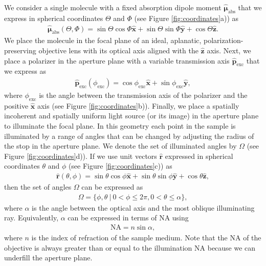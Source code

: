 \documentclass[10pt]{article}
\providecommand{\mb}[1]{\mathbf{#1}}
\providecommand{\mh}[1]{\mathbf{\hat{#1}}}
\providecommand{\bs}[1]{\boldsymbol{#1}}
\begin{document}
We consider a single molecule with a fixed absorption dipole moment
$\hat{\bs{\mu}}_{\text{abs}}$ that we express in spherical coordinates $\Theta$
and $\Phi$ (see Figure \ref{fig:coordinates}a)) as
\begin{align}
  \hat{\bs{\mu}}_{\text{abs}}(\Theta, \Phi) = \sin\Theta\cos\Phi\hat{\mb{x}} + \sin\Theta\sin\Phi\hat{\mb{y}} + \cos\Theta\hat{\mb{z}} \label{eq:mu}.
\end{align}
We place the molecule in the focal plane of an ideal, aplanatic,
polarization-preserving objective lens with its optical axis aligned with the
$\mh{z}$ axis. Next, we place a polarizer in the aperture plane with a variable
transmission axis $\hat{\mb{p}}_{\text{exc}}$ that we express as
\begin{align}
 \hat{\mb{p}}_{\text{exc}}(\phi_{\text{exc}}) = \cos\phi_{\text{exc}}\hat{\mb{x}} +
\sin\phi_{\text{exc}}\hat{\mb{y}},\label{eq:excfield}
\end{align}
where $\phi_{\text{exc}}$ is the angle between the transmission axis of the
polarizer and the positive $\mh{x}$ axis (see Figure
\ref{fig:coordinates}b)). Finally, we place a spatially incoherent and spatially
uniform light source (or its image) in the aperture plane to illuminate the
focal plane. In this geometry each point in the sample is illuminated by a range
of angles that can be changed by adjusting the radius of the stop in the
aperture plane. We denote the set of illuminated angles by $\Omega$ (see Figure
\ref{fig:coordinates}d)). If we use unit vectors $\hat{\mb{r}}$ expressed in
spherical coordinates $\theta$ and $\phi$ (see Figure \ref{fig:coordinates}c))
as
  \begin{align}
   \hat{\mb{r}}(\theta, \phi) = \sin\theta\cos\phi\hat{\mb{x}} + \sin\theta\sin\phi\hat{\mb{y}} + \cos\theta\hat{\mb{z}}, 
  \end{align}
  then the set of angles $\Omega$ can be expressed as
  \begin{align}
  \Omega = \{\phi, \theta\ |\ 0 < \phi \leq 2\pi, 0 < \theta \leq \alpha\},
  \end{align}
  where $\alpha$ is the angle between the optical axis and the most oblique
  illuminating ray. Equivalently, $\alpha$ can be expressed in terms of NA using
  \begin{align}
    \text{NA} = n\sin\alpha, 
  \end{align}
  where $n$ is the index of refraction of the sample medium. Note that the NA of
  the objective is always greater than or equal to the illumination NA because
  we can underfill the aperture plane.
  
\end{document}
